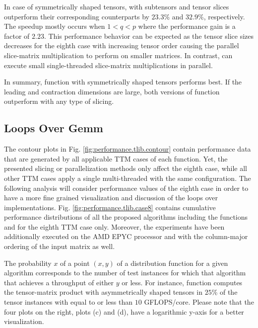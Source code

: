 In case of symmetrically shaped tensors,  with subtensors and tensor slices outperform their corresponding  counterparts by $23.3$\% and $32.9$\%, respectively.
The speedup mostly occurs when $1<q<p$ where the performance gain is a factor of $2.23$.
This performance behavior can be expected as the tensor slice sizes decreases for the eighth case with increasing tensor order causing the parallel slice-matrix multiplication to perform on smaller matrices.
In contrast,  can execute small single-threaded slice-matrix multiplications in parallel.

In summary, function  with symmetrically shaped tensors performs best.
If the leading and contraction dimensions are large, both versions of function  outperform  with any type of slicing. 

\subsection{Loops Over Gemm}
\label{subsec:results.log}
The contour plots in Fig. \ref{fig:performance.tlib.contour} contain performance data that are generated by all applicable TTM cases of each  function.
Yet, the presented slicing or parallelization methods only affect the eighth case, while all other TTM cases apply a single multi-threaded  with the same configuration.
The following analysis will consider performance values of the eighth case in order to have a more fine grained visualization and discussion of the loops over  implementations.
Fig. \ref{fig:performance.tlib.case8} contains cumulative performance distributions of all the proposed algorithms including the functions  and  for the eighth TTM case only.
Moreover, the experiments have been additionally executed on the AMD EPYC processor and with the column-major ordering of the input matrix as well.

The probability $x$ of a point $(x,y)$ of a distribution function for a given algorithm corresponds to the number of test instances for which that algorithm that achieves a throughput of either $y$ or less.
For instance, function  computes the tensor-matrix product with asymmetrically shaped tensors in $25$\% of the tensor instances with equal to or less than $10$ GFLOPS/core.
Please note that the four plots on the right, plots (c) and (d), have a logarithmic y-axis for a better visualization.


